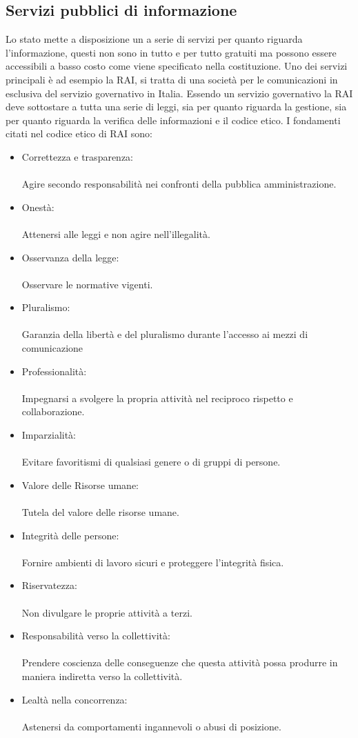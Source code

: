 \documentclass{article}
\begin{document}
\subsection{Servizi pubblici di informazione}
Lo stato mette a disposizione un
a serie di servizi per quanto riguarda l'informazione, questi non sono in tutto e per tutto gratuiti ma possono essere accessibili a basso costo come viene specificato nella costituzione.
Uno dei servizi principali è ad esempio la RAI, si tratta di una società per le comunicazioni in esclusiva del servizio governativo in Italia.
Essendo un servizio governativo la RAI deve sottostare a tutta una serie di leggi, sia per quanto riguarda la gestione, sia per quanto riguarda la verifica delle informazioni e il codice etico.
I fondamenti citati nel codice etico di RAI sono:
\begin{itemize}
 \item Correttezza e trasparenza:\\
 \\
 Agire secondo responsabilità nei confronti della pubblica amministrazione.
 \item Onestà: \\
 \\
  Attenersi alle leggi e non agire nell'illegalità.
 \item Osservanza della legge: \\
 \\
 Osservare le  normative vigenti.
 \item Pluralismo: \\
 \\
 Garanzia della libertà e del pluralismo durante l'accesso ai mezzi di comunicazione
 \item Professionalità: \\
 \\
 Impegnarsi a svolgere la propria attività nel reciproco rispetto e collaborazione.
 \item Imparzialità: \\
 \\
 Evitare favoritismi di qualsiasi genere o di gruppi di persone.
 \item Valore delle Risorse umane: \\
 \\
 Tutela del valore delle risorse umane.
 \item Integrità delle persone: \\
 \\
 Fornire ambienti di lavoro sicuri e proteggere l'integrità fisica.
 \item Riservatezza: \\
 \\
 Non divulgare le proprie attività a terzi.
 \item Responsabilità verso la collettività: \\
 \\
 Prendere coscienza delle conseguenze che questa attività possa produrre in maniera indiretta verso la collettività.
 \item Lealtà nella concorrenza: \\
 \\
 Astenersi da comportamenti ingannevoli o abusi di posizione.
\end{itemize}
\end{document}
